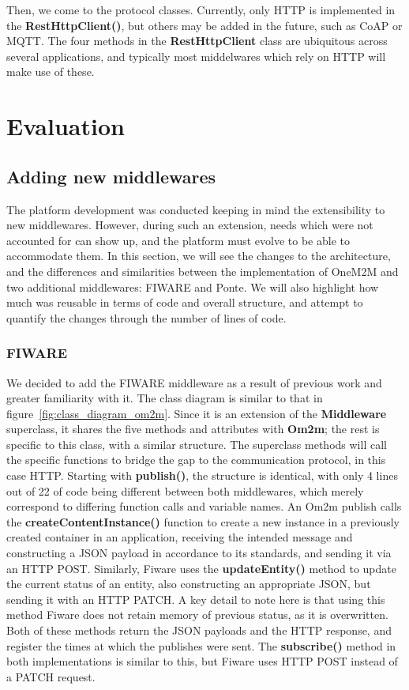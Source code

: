 \documentclass[conference]{IEEEtran}
\begin{document}
Then, we come to the protocol classes. Currently, only HTTP is implemented in the \textbf{RestHttpClient()}, but others may be added in the future, such as CoAP or MQTT\@. The four methods in the \textbf{RestHttpClient} class are ubiquitous across several applications, and typically most middelwares which rely on HTTP will make use of these. 

\section{Evaluation}

\subsection{Adding new middlewares}

The platform development was conducted keeping in mind the extensibility to new middlewares. 
However, during such an extension, needs which were not accounted for can show up, and the platform must evolve to be able to accommodate them. In this section, we will see the changes to the architecture, and the differences and similarities between the implementation of OneM2M and two additional middlewares: FIWARE and Ponte. We will also highlight how much was reusable in terms of code and overall structure, and attempt to quantify the changes through the number of lines of code. 

\subsubsection{FIWARE}

We decided to add the FIWARE middleware as a result of previous work and greater familiarity with it. The class diagram is similar to that in figure~\ref{fig:class_diagram_om2m}. Since it is an extension of the \textbf{Middleware} superclass, it shares the five methods and attributes with \textbf{Om2m}; the rest is specific to this class, with a similar structure. The superclass methods will call the specific functions to bridge the gap to the communication protocol, in this case HTTP\@. Starting with \textbf{publish()}, the structure is identical, with only 4 lines out of 22 of code being different between both middlewares, which merely correspond to differing function calls and variable names. An Om2m publish calls the \textbf{createContentInstance()} function to create a new instance in a previously created container in an application, receiving the intended message and constructing a JSON payload in accordance to its standards, and sending it via an HTTP POST\@. Similarly, Fiware uses the \textbf{updateEntity()} method to update the current status of an entity, also constructing an appropriate JSON, but sending it with an HTTP PATCH. A key detail to note here is that using this method Fiware does not retain memory of previous status, as it is overwritten. Both of these methods return the JSON payloads and the HTTP response, and register the times at which the publishes were sent. The \textbf{subscribe()} method in both implementations is similar to this, but Fiware uses HTTP POST instead of a PATCH request.
\end{document}
